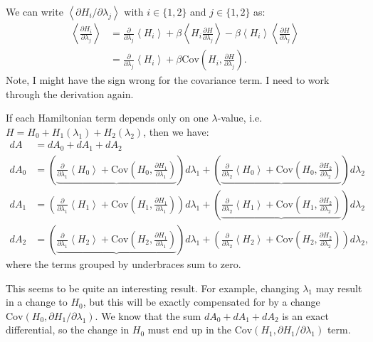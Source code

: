 \documentclass[%
 preprint,
 amsmath,amssymb,
 aps,
]{revtex4-1}
\begin{document}
We can write $\left<\partial H_i / \partial \lambda_j\right>$ with $i \in \{1,2\}$ and $j \in \{1,2\}$ as:
\begin{align}
\left<\frac{\partial H_i}{\partial \lambda_j}\right> &=
\frac{\partial}{\partial \lambda_j}\left<H_i\right> +
\beta\left<H_i\frac{\partial H}{\partial \lambda_j}\right>
-\beta\left<H_i\right>\left<\frac{\partial H}{\partial \lambda_j}\right> \\
&= \frac{\partial}{\partial \lambda_j}\left<H_i\right> +
\beta \mathrm{Cov}\left( H_i, \frac{\partial H}{\partial \lambda_j}\right).
\end{align}
Note, I might have the sign wrong for the covariance term. I need to work through the derivation again.

If each Hamiltonian term depends only on one $\lambda$-value, i.e. $H = H_0 + H_1(\lambda_1) + H_2(\lambda_2)$, then we have:
\begin{align}
dA &= dA_0 + dA_1 + dA_2 \\
dA_0 &=
\left( \underbrace{
	\frac{\partial}{\partial \lambda_1}
    	\left<H_0\right> +
    \mathrm{Cov}\left(H_0,
    	\frac{\partial H_1}{\partial \lambda_1}
    \right)
} \right) d\lambda_1 +
\left( \underbrace{
	\frac{\partial}{\partial \lambda_2}
    	\left<H_0\right> +
    \mathrm{Cov}\left(H_0,
    	\frac{\partial H_2}{\partial \lambda_2}
    \right)
} \right) d\lambda_2 \\
dA_1 &=
\left(
	\frac{\partial}{\partial \lambda_1}
    	\left<H_1\right> +
    \mathrm{Cov}\left(H_1,
    	\frac{\partial H_1}{\partial \lambda_1}
    \right)
\right) d\lambda_1 +
\left(\underbrace{
	\frac{\partial}{\partial \lambda_2}
    	\left<H_1\right> +
    \mathrm{Cov}\left(H_1,
    	\frac{\partial H_2}{\partial \lambda_2}
    \right)
}\right) d\lambda_2 \\
dA_2 &=
\left(\underbrace{
	\frac{\partial}{\partial \lambda_1}
    	\left<H_2\right> +
    \mathrm{Cov}\left(H_2,
    	\frac{\partial H_1}{\partial \lambda_1}
    \right)
}\right) d\lambda_1 +
\left(
	\frac{\partial}{\partial \lambda_2}
    	\left<H_2\right> +
    \mathrm{Cov}\left(H_2,
    	\frac{\partial H_2}{\partial \lambda_2}
    \right)
\right) d\lambda_2,
\end{align}
where the terms grouped by underbraces sum to zero.

This seems to be quite an interesting result. For example, changing $\lambda_1$ may result in a change to $H_0$, but this will be exactly compensated for by a change $\mathrm{Cov}(H_0, \partial H_1 / \partial \lambda_1)$. We know that the sum $dA_0 + dA_1 + dA_2$ is an exact differential, so the change in $H_0$ must end up in the $\mathrm{Cov}(H_1, \partial H_1 / \partial \lambda_1)$ term.
\end{document}
